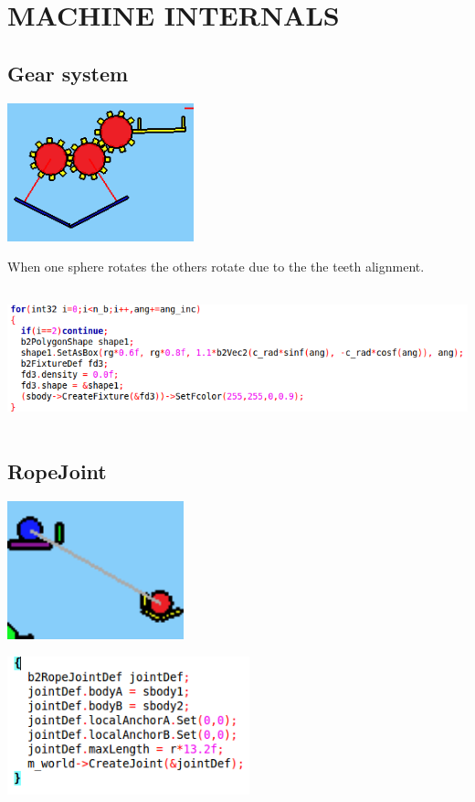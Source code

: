 \documentclass[a4paper, 11pt]{article}
\begin{document}
\section{MACHINE INTERNALS}

\subsection*{Gear system}
\begin{center}
\includegraphics[height=4cm]{img/gears.png}    
\end{center}
When one sphere rotates the others rotate due to the the teeth alignment.\\
\begin{center}
\includegraphics[height=4cm]{img/gearTeeth.png}    
\end{center}

\subsection*{RopeJoint}
\begin{center}
\includegraphics[height=4cm]{img/ropeJoint.png}    
\end{center}
\begin{center}
\includegraphics[height=4cm]{img/ropeJointImplementation.png}    
\end{center}
\end{document}
